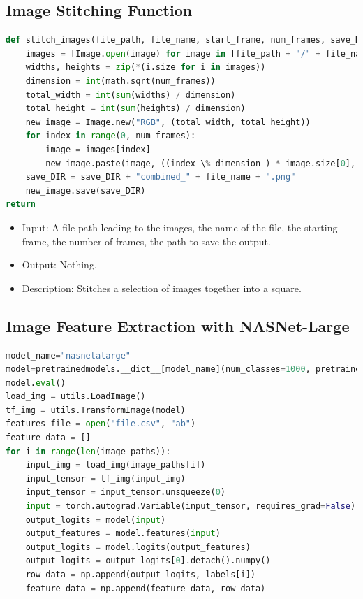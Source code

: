 \documentclass[12pt]{article}
\numberwithin{figure}{section} %
\begin{document}
\subsection{Image Stitching Function}
\label{subsection:Image Stitching Function}
\begin{lstlisting}[language = Python]
def stitch_images(file_path, file_name, start_frame, num_frames, save_DIR):
    images = [Image.open(image) for image in [file_path + "/" + file_name + str(x) + ".png" for x in range(start_frame, start_frame + num_frames)]]
    widths, heights = zip(*(i.size for i in images))
    dimension = int(math.sqrt(num_frames))
    total_width = int(sum(widths) / dimension)
    total_height = int(sum(heights) / dimension)
    new_image = Image.new("RGB", (total_width, total_height))
    for index in range(0, num_frames):
        image = images[index]
        new_image.paste(image, ((index \% dimension ) * image.size[0], math.floor(index / dimension) * image.size[1]))
    save_DIR = save_DIR + "combined_" + file_name + ".png"
    new_image.save(save_DIR)
return
\end{lstlisting}
\vspace{-1.5em}
\begin{itemize}[leftmargin = 0.5cm, topsep=0pt,itemsep=-1ex,partopsep=1ex,parsep=1ex]
\item Input: A file path leading to the images, the name of the file, the starting frame, the number of frames, the path to save the output.  
\item Output: Nothing. 
\item Description: Stitches a selection of images together into a square.  
\end{itemize}


\subsection{Image Feature Extraction with NASNet-Large}
\label{subsection:Image Feature Extraction with NASNet-Large}
\begin{lstlisting}[language = Python]
model_name="nasnetalarge"
model=pretrainedmodels.__dict__[model_name](num_classes=1000, pretrained='imagenet')
model.eval()
load_img = utils.LoadImage()
tf_img = utils.TransformImage(model)
features_file = open("file.csv", "ab")
feature_data = []
for i in range(len(image_paths)):
    input_img = load_img(image_paths[i])
    input_tensor = tf_img(input_img)
    input_tensor = input_tensor.unsqueeze(0)
    input = torch.autograd.Variable(input_tensor, requires_grad=False)
    output_logits = model(input)
    output_features = model.features(input)
    output_logits = model.logits(output_features)
    output_logits = output_logits[0].detach().numpy()
    row_data = np.append(output_logits, labels[i])
    feature_data = np.append(feature_data, row_data)
\end{lstlisting}
\end{document}

